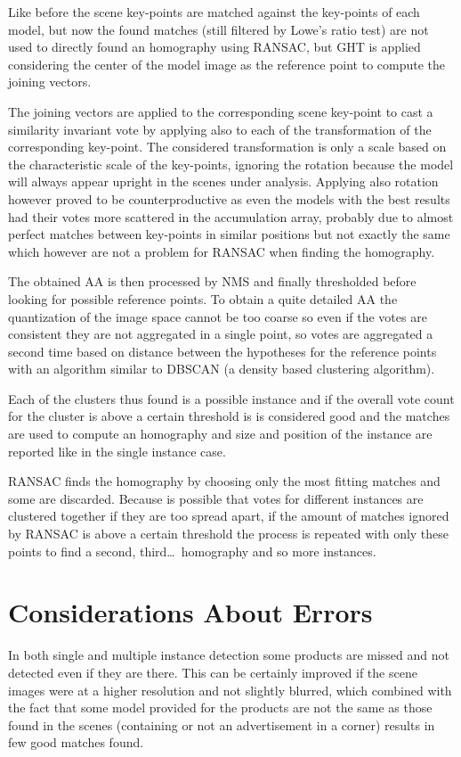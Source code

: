 Like before the scene key-points are matched against the key-points of each model, but now the found matches (still filtered by Lowe's ratio test) are not used to directly found an homography using RANSAC, but GHT is applied considering the center of the model image as the reference point to compute the joining vectors.

The joining vectors are applied to the corresponding scene key-point to cast a similarity invariant vote by applying also to each of the transformation of the corresponding key-point.
The considered transformation is only a scale based on the characteristic scale of the key-points, ignoring the rotation because the model will always appear upright in the scenes under analysis.
Applying also rotation however proved to be counterproductive as even the models with the best results had their votes more scattered in the accumulation array, probably due to almost perfect matches between key-points in similar positions but not exactly the same which however are not a problem for RANSAC when finding the homography.

The obtained AA is then processed by NMS and finally thresholded before looking for possible reference points.
To obtain a quite detailed AA the quantization of the image space cannot be too coarse so even if the votes are consistent they are not aggregated in a single point, so votes are aggregated a second time based on distance between the hypotheses for the reference points with an algorithm similar to DBSCAN (a density based clustering algorithm).

Each of the clusters thus found is a possible instance and if the overall vote count for the cluster is above a certain threshold is is considered good and the matches are used to compute an homography and size and position of the instance are reported like in the single instance case.

RANSAC finds the homography by choosing only the most fitting matches and some are discarded.
Because is possible that votes for different instances are clustered together if they are too spread apart, if the amount of matches ignored by RANSAC is above a certain threshold the process is repeated with only these points to find a second, third\ldots\ homography and so more instances.

\section{Considerations About Errors}
In both single and multiple instance detection some products are missed and not detected even if they are there.
This can be certainly improved if the scene images were at a higher resolution and not slightly blurred, which combined with the fact that some model provided for the products are not the same as those found in the scenes (\ie containing or not an advertisement in a corner) results in few good matches found.


